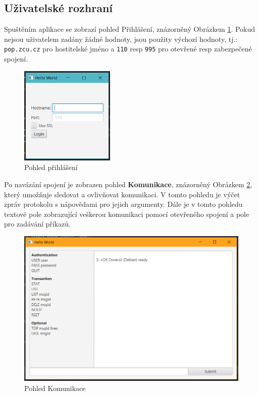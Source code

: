 \documentclass[12pt,a4paper]{article}
\begin{document}
\newpage
\subsection{Uživatelské rozhraní}

Spuštěním aplikace se zobrazí pohled Přihlášení, znázorněný Obrázkem \ref{fig:login}.
Pokud nejsou uživatelem zadány žádné hodnoty, jsou použity výchozí hodnoty, tj.: \texttt{pop.zcu.cz} pro hostitelské jméno a \texttt{110} resp \texttt{995} pro otevřené resp zabezpečené spojení.

\begin{figure}[h]
\centering
\includegraphics[width=45mm]{img/01_login}
\caption{Pohled přihlášení}
\label{fig:login}
\end{figure}

Po navázání spojení je zobrazen pohled \textbf{Komunikace}, znázorněný Obrázkem \ref{fig:communication}, který umožňuje sledovat a ovlivňovat komunikaci.
V tomto pohledu je výčet zpráv protokolu s nápovědami pro jejich argumenty.
Dále je v tomto pohledu textové pole zobrazující veškerou komunikaci pomocí otevřeného spojení a pole pro zadávání příkazů.

\begin{figure}[h]
	\centering
	\includegraphics[width=120mm]{img/02_runtime}
	\caption{Pohled Komunikace}
	\label{fig:communication}
\end{figure}
\end{document}

